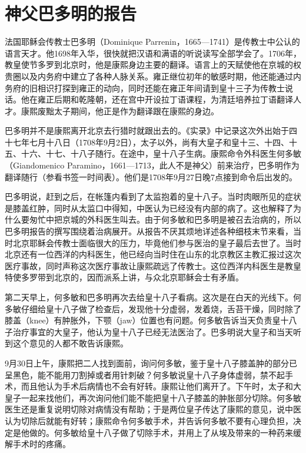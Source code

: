 \section{神父巴多明的报告}


法国耶稣会传教士巴多明（Dominique Parrenin，1665—1741）是传教士中公认的语言天才。他1698年入华，很快就把汉语和满语的听说读写全部学会了。1706年，教皇使节多罗到北京时，他是康熙身边主要的翻译。语言上的天赋使他在京城的权贵圈以及内务府中建立了各种人脉关系。雍正继位初年的敏感时期，他还能通过内务府的旧相识打探到雍正的动向，同时还能在雍正年间请到皇十三子为传教士说话。他在雍正后期和乾隆朝，还在宫中开设拉丁语课程，为清廷培养拉丁语翻译人才。康熙废黜太子期间，他正是作为翻译跟在康熙的身边。



巴多明并不是康熙离开北京去行猎时就跟出去的。《实录》中记录这次外出始于四十七年七月十八日（1708年9月2日），太子以外，尚有大皇子和皇十三、十四、十五、十六、十七、十八子随行。在途中，皇十八子生病。康熙命令外科医生何多敏（Giandomenico Paramino，1661—1713，此人不是神父）前来治疗，巴多明作为翻译随行（参看书签一时间表）。他们是1708年9月27日晚7点接到命令后出发的。



巴多明说，赶到之后，在帐篷内看到了太监抱着的皇十八子。当时肉眼所见的症状是膝盖红肿，同时从太监口中得知，中医认为已经没有内部的病了。这也解释了为什么要匆忙中把京城的外科医生叫去。由于何多敏和巴多明是被召去治病的，所以巴多明报告的撰写围绕着治病展开。从报告不厌其烦地详述各种细枝末节来看，当时北京耶稣会传教士面临很大的压力，毕竟他们参与医治的皇子最后去世了。当时北京还有一位西洋的内科医生，他已经向当时住在山东的北京教区主教汇报过这次医疗事故，同时声称这次医疗事故让康熙疏远了传教士。这位西洋内科医生是教皇特使多罗带到北京的，因而派系上讲，与众北京耶稣会士有矛盾。



第二天早上，何多敏和巴多明再次去给皇十八子看病。这次是在白天的光线下。何多敏仔细给皇十八子做了检查后，发现他十分虚弱，发着烧，舌苔干燥，同时除了膝盖（knee）有肿胀外，下颚（jaw）位置也有问题。何多敏告诉当天负责皇十八子治疗事宜的大皇子，他认为皇十八子已经无法医治了。巴多明说大皇子和当天听到这个意见的人都不敢告诉康熙。



9月30日上午，康熙把二人找到面前，询问何多敏，鉴于皇十八子膝盖肿的部分已呈黑色，能不能用刀割掉或者用针刺破？何多敏说皇十八子身体虚弱，禁不起手术，而且他认为手术后病情也不会有好转。康熙让他们离开了。下午时，太子和大皇子一起来找他们，再次询问他们能不能把皇十八子膝盖的肿胀部分切除。何多敏医生还是重复说明切除对病情没有帮助；于是两位皇子传达了康熙的意见，说中医认为切除后就能有好转；康熙命令何多敏手术，并告诉何多敏不要有心理负担，决定是他做的。何多敏给皇十八子做了切除手术，并用上了从埃及带来的一种药来缓解手术时的疼痛。



